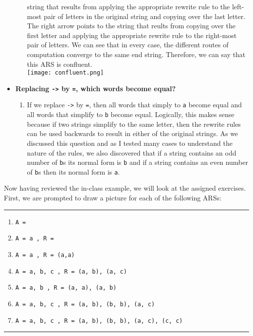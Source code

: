\documentclass{article}
\theoremstyle{theorem}
\theoremstyle{definition}
\theoremstyle{remark}
\begin{document}
\begin{itemize}
\begin{enumerate}
      string that results from applying the appropriate rewrite rule to the left-most pair of letters in the original string and copying over the last letter. The right arrow points to
      the string that reults from copying over the first letter and applying the appropriate rewrite rule to the right-most pair of letters. We can see that in every case, the different 
      routes of computation converge to the same end string. Therefore, we can say that this ARS is confluent. \\
      \texttt{[image: confluent.png]}\\
    \end{enumerate}
  \item[\ding{99}] \textbf{Replacing \texttt{->} by \texttt{=}, which words become equal?}
    \begin{enumerate} 
      \item[] If we replace \texttt{->} by \texttt{=}, then all words that simply to \texttt{a} become equal and all words that simplify to 
      \texttt{b} become equal. Logically, this makes sense because if two strings simplify to the same letter, then the rewrite rules can be used backwards to result in either 
      of the original strings. As we discussed this question and as I tested many cases to understand the nature of the rules, we also discovered that if a string contains an odd number of \texttt{b}s its 
      normal form is \texttt{b} and if a string contains an even number of \texttt{b}s then its normal form is \texttt{a}.
    \end{enumerate}
\end{itemize}


Now having reviewed the in-class example, we will look at the assigned exercises. First, we are prompted to draw a picture for each of the following ARSs:

\noindent
  {\color{gray} \rule{\linewidth}{0.05mm}}
\begin{enumerate}
  \item[\ding{99}] \texttt{A = {}}
  \item[\ding{99}] \texttt{A = {a} , R = {}}
  \item[\ding{99}] \texttt{A = {a} , R = {(a,a)}}
  \item[\ding{99}] \texttt{A = {a, b, c} , R = {(a, b), (a, c)}}
  \item[\ding{99}] \texttt{A = {a, b} , R = {(a, a), (a, b)}}
  \item[\ding{99}] \texttt{A = {a, b, c} , R = {(a, b), (b, b), (a, c)}}
  \item[\ding{99}] \texttt{A = {a, b, c} , R = {(a, b), (b, b), (a, c), (c, c)}}
\end{enumerate}
\noindent
  {\color{gray} \rule{\linewidth}{0.05mm}}
\end{document}
